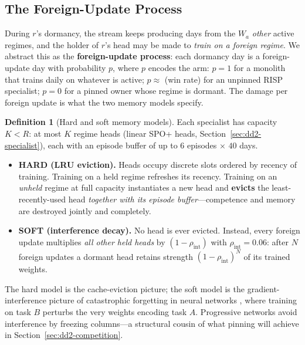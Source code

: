 \documentclass[11pt,a4paper]{article}
\theoremstyle{definition}
\newtheorem{definition}{Definition}[section]
\theoremstyle{plain}
\newcommand{\nm}{\textsc{RISP}}
\begin{document}
\subsection{The Foreign-Update Process}

During $r$'s dormancy, the stream keeps producing days from the $W_a$
\emph{other} active regimes, and the holder of $r$'s head may be made to
\emph{train on a foreign regime}. We abstract this as the
\textbf{foreign-update process}: each dormancy day is a foreign-update day
with probability $p$, where $p$ encodes the arm: $p = 1$ for a monolith that
trains daily on whatever is active; $p \approx$ (win rate) for an unpinned
\nm{} specialist; $p = 0$ for a pinned owner whose regime is dormant. The
damage per foreign update is what the two memory models specify.

\begin{definition}[Hard and soft memory models]
\label{def:dd2-memory-models}
Each specialist has capacity $K < R$: at most $K$ regime heads (linear SPO+
heads, Section~\ref{sec:dd2-specialist}), each with an episode buffer of up to
$6$ episodes $\times$ $40$ days.
\begin{itemize}
  \item \textbf{HARD (LRU eviction).} Heads occupy discrete slots ordered by
        recency of training. Training on a held regime refreshes its recency.
        Training on an \emph{unheld} regime at full capacity instantiates a
        new head and \textbf{evicts} the least-recently-used head
        \emph{together with its episode buffer}---competence and memory are
        destroyed jointly and completely.
  \item \textbf{SOFT (interference decay).} No head is ever evicted. Instead,
        every foreign update multiplies \emph{all other held heads} by
        $(1 - \rho_{\mathrm{int}})$ with $\rho_{\mathrm{int}} = 0.06$:
        after $N$ foreign updates a dormant head retains strength
        $(1 - \rho_{\mathrm{int}})^{N}$ of its trained weights.
\end{itemize}
\end{definition}

The hard model is the cache-eviction picture; the soft model is the
gradient-interference picture of catastrophic forgetting in neural networks
\citep{french1999catastrophic, kirkpatrick2017overcoming, parisi2019continual},
where training on task $B$ perturbs the very weights encoding task $A$.
Progressive networks \citep{rusu2016progressive} avoid interference by
freezing columns---a structural cousin of what pinning will achieve in
Section~\ref{sec:dd2-competition}.
\end{document}
